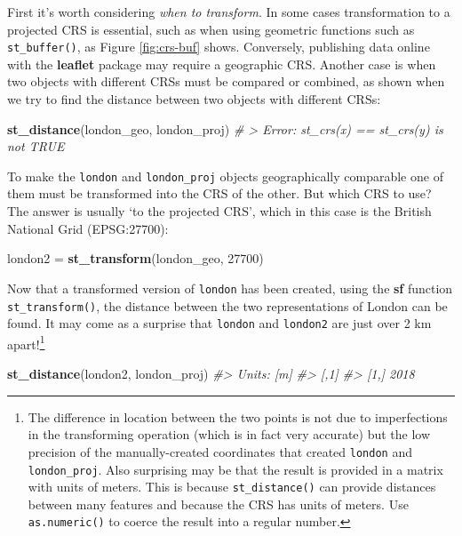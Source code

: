 \documentclass[]{krantz}
\newenvironment{Shaded}{\begin{snugshade}}{\end{snugshade}}
\newcommand{\CommentTok}[1]{\textcolor[rgb]{0.37,0.37,0.37}{\textit{#1}}}
\newcommand{\DecValTok}[1]{\textcolor[rgb]{0.06,0.06,0.06}{#1}}
\newcommand{\KeywordTok}[1]{\textcolor[rgb]{0.27,0.27,0.27}{\textbf{#1}}}
\newcommand{\NormalTok}[1]{#1}
\newcommand{\StringTok}[1]{\textcolor[rgb]{0.5,0.5,0.5}{#1}}
\let\rmarkdownfootnote\footnote%
\def\footnote{\protect\rmarkdownfootnote}
\begin{document}
First it's worth considering \emph{when to transform}.
In some cases transformation to a projected CRS is essential, such as when using geometric functions such as \texttt{st\_buffer()}, as Figure \ref{fig:crs-buf} shows.
Conversely, publishing data online with the \textbf{leaflet} package may require a geographic CRS.
Another case is when two objects with different CRSs must be compared or combined, as shown when we try to find the distance between two objects with different CRSs:

\begin{Shaded}
\begin{Highlighting}[]
\KeywordTok{st_distance}\NormalTok{(london_geo, london_proj)}
\CommentTok{# > Error: st_crs(x) == st_crs(y) is not TRUE}
\end{Highlighting}
\end{Shaded}

To make the \texttt{london} and \texttt{london\_proj} objects geographically comparable one of them must be transformed into the CRS of the other.
But which CRS to use?
The answer is usually `to the projected CRS', which in this case is the British National Grid (EPSG:27700):

\begin{Shaded}
\begin{Highlighting}[]
\NormalTok{london2 =}\StringTok{ }\KeywordTok{st_transform}\NormalTok{(london_geo, }\DecValTok{27700}\NormalTok{)}
\end{Highlighting}
\end{Shaded}

Now that a transformed version of \texttt{london} has been created, using the \textbf{sf} function \texttt{st\_transform()}, the distance between the two representations of London can be found.
It may come as a surprise that \texttt{london} and \texttt{london2} are just over 2 km apart!\footnote{The difference in location between the two points is not due to imperfections in the transforming operation (which is in fact very accurate) but the low precision of the manually-created coordinates that created \texttt{london} and \texttt{london\_proj}.
  Also surprising may be that the result is provided in a matrix with units of meters.
  This is because \texttt{st\_distance()} can provide distances between many features and because the CRS has units of meters.
  Use \texttt{as.numeric()} to coerce the result into a regular number.}

\begin{Shaded}
\begin{Highlighting}[]
\KeywordTok{st_distance}\NormalTok{(london2, london_proj)}
\CommentTok{#> Units: [m]}
\CommentTok{#>      [,1]}
\CommentTok{#> [1,] 2018}
\end{Highlighting}
\end{Shaded}
\end{document}
